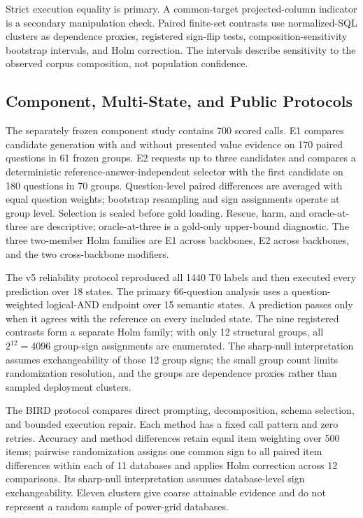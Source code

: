 \documentclass[applsci,article,submit,moreauthors]{Definitions/mdpi}
\begin{document}
Strict execution equality is primary. A common-target projected-column indicator is a secondary manipulation check. Paired finite-set contrasts use normalized-SQL clusters as dependence proxies, registered sign-flip tests, composition-sensitivity bootstrap intervals, and Holm correction. The intervals describe sensitivity to the observed corpus composition, not population confidence.

\subsection{Component, Multi-State, and Public Protocols}

The separately frozen component study contains 700 scored calls. E1 compares candidate generation with and without presented value evidence on 170 paired questions in 61 frozen groups. E2 requests up to three candidates and compares a deterministic reference-answer-independent selector with the first candidate on 180 questions in 70 groups. Question-level paired differences are averaged with equal question weights; bootstrap resampling and sign assignments operate at group level. Selection is sealed before gold loading. Rescue, harm, and oracle-at-three are descriptive; oracle-at-three is a gold-only upper-bound diagnostic. The three two-member Holm families are E1 across backbones, E2 across backbones, and the two cross-backbone modifiers.

The v5 reliability protocol reproduced all 1440 T0 labels and then executed every prediction over 18 states. The primary 66-question analysis uses a question-weighted logical-AND endpoint over 15 semantic states. A prediction passes only when it agrees with the reference on every included state. The nine registered contrasts form a separate Holm family; with only 12 structural groups, all $2^{12}=4096$ group-sign assignments are enumerated. The sharp-null interpretation assumes exchangeability of those 12 group signs; the small group count limits randomization resolution, and the groups are dependence proxies rather than sampled deployment clusters.

The BIRD protocol compares direct prompting, decomposition, schema selection, and bounded execution repair. Each method has a fixed call pattern and zero retries. Accuracy and method differences retain equal item weighting over 500 items; pairwise randomization assigns one common sign to all paired item differences within each of 11 databases and applies Holm correction across 12 comparisons. Its sharp-null interpretation assumes database-level sign exchangeability. Eleven clusters give coarse attainable evidence and do not represent a random sample of power-grid databases.
\end{document}
